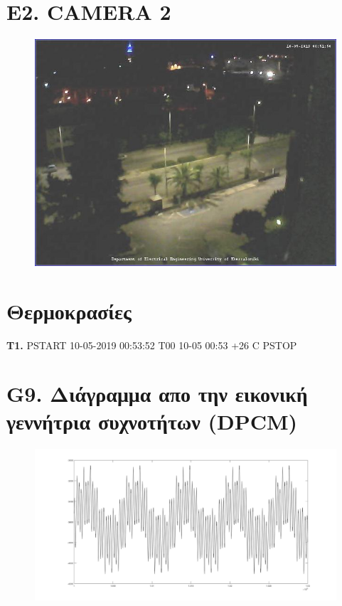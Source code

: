 \documentclass{article}
\begin{document}
\section*{E2. CAMERA 2}

\begin{figure}[h!]
 \begin{center}
 \advance\leftskip-4cm
  \includegraphics[width=200mm,scale=0.7]{pic2s1.jpeg}
   
  
\end{center}
\end{figure}
\newpage
\section*{Θερμοκρασίες}
\textbf{Τ1.} PSTART 10-05-2019 00:53:52 T00 10-05 00:53 +26 C PSTOP
\section*{G9. Διάγραμμα απο την εικονική γεννήτρια συχνοτήτων (DPCM)}
\begin{figure}[h!]
 \begin{center}
 \advance\leftskip-4cm
  \includegraphics[width=200mm,scale=0.7]{g9s1.jpg}
\end{center}
\end{figure}
\newpage
\end{document}
